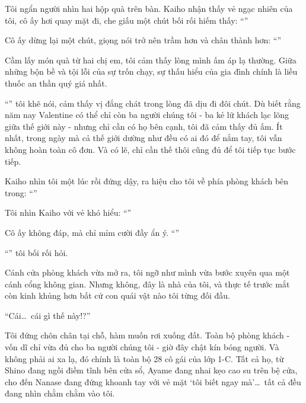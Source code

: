 \documentclass[../main.tex]{subfiles}
\begin{document}
Tôi ngẩn người nhìn hai hộp quà trên bàn. Kaiho nhận thấy vẻ ngạc nhiên của tôi, cô ấy hơi quay mặt đi, che giấu một chút bối rối hiếm thấy: ``''

Cô ấy dừng lại một chút, giọng nói trở nên trầm hơn và chân thành hơn: ``''

Cầm lấy món quà từ hai chị em, tôi cảm thấy lòng mình ấm áp lạ thường. Giữa những bộn bề và tội lỗi của sự trốn chạy, sự thấu hiểu của gia đình chính là liều thuốc an thần quý giá nhất.

``'' tôi khẽ nói, cảm thấy vị đắng chát trong lòng đã dịu đi đôi chút. Dù biết rằng năm nay Valentine có thể chỉ còn ba người chúng tôi - ba kẻ lữ khách lạc lõng giữa thế giới này - nhưng chỉ cần có họ bên cạnh, tôi đã cảm thấy đủ ấm. Ít nhất, trong ngày mà cả thế giới dường như đều có ai đó để nắm tay, tôi vẫn không hoàn toàn cô đơn. Và có lẽ, chỉ cần thế thôi cũng đủ để tôi tiếp tục bước tiếp.

Kaiho nhìn tôi một lúc rồi đứng dậy, ra hiệu cho tôi về phía phòng khách bên trong: ``''

Tôi nhìn Kaiho với vẻ khó hiểu: ``''

Cô ấy không đáp, mà chỉ mỉm cười đầy ẩn ý. ``''

``'' tôi bối rối hỏi.

Cánh cửa phòng khách vừa mở ra, tôi ngỡ như mình vừa bước xuyên qua một cánh cổng không gian. Nhưng không, đây là nhà của tôi, và thực tế trước mắt còn kinh khủng hơn bất cứ con quái vật nào tôi từng đối đầu.

``Cái\dots\ cái gì thế này!?''

Tôi đứng chôn chân tại chỗ, hàm muốn rơi xuống đất. Toàn bộ phòng khách - vốn dĩ chỉ vừa đủ cho ba người chúng tôi - giờ đây chật kín bóng người. Và không phải ai xa lạ, đó chính là toàn bộ 28 cô gái của lớp 1-C. Tất cả họ, từ Shino đang ngồi điềm tĩnh bên cửa sổ, Ayame đang nhai kẹo cao su trên bệ cửa, cho đến Nanase đang đứng khoanh tay với vẻ mặt `tôi biết ngay mà'\dots\ tất cả đều đang nhìn chằm chằm vào tôi.
\end{document}
